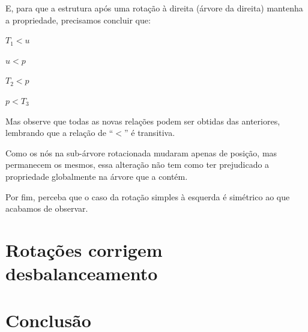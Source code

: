 \documentclass[11pt,twoside]{article}
\theoremstyle{definition}
\begin{document}
      E, para que a estrutura após uma rotação à direita (árvore da direita) mantenha a propriedade, precisamos concluir que:
      \begin{itemize}
        \begin{multicols}{2}
          \item \( T_1 < u \)
          \item \( u < p \)
          \item \( T_2 < p \)
          \item \( p < T_3 \)
        \end{multicols}
      \end{itemize}

      Mas observe que todas as novas relações podem ser obtidas das anteriores, lembrando que a relação de ``\( < \)'' é transitiva.

      Como os nós na sub-árvore rotacionada mudaram apenas de posição, mas permanecem os mesmos, essa alteração não tem como ter prejudicado a propriedade globalmente na árvore que a contém.

      Por fim, perceba que o caso da rotação simples à esquerda é simétrico ao que acabamos de observar.

    \section{Rotações corrigem desbalanceamento}

    \section{Conclusão}




\end{document}
